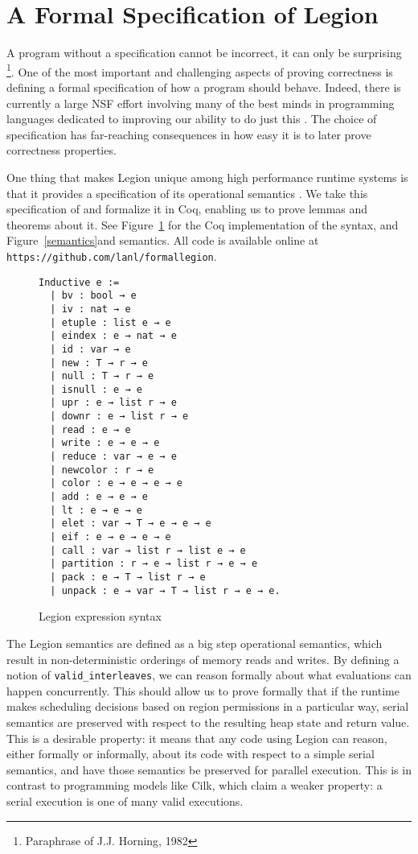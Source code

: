 \documentclass[sigconf]{acmart}
\begin{document}
\section{A Formal Specification of Legion}

A program without a specification cannot be incorrect, it can only be
surprising \footnote{Paraphrase of J.J. Horning, 1982}. One of the most
important and challenging aspects of proving correctness is defining a formal
specification of how a program should behave. Indeed, there is currently a
large NSF effort involving many of the best minds in programming languages
dedicated to improving our ability to do just this \cite{deepspec}. The choice
of specification has far-reaching consequences in how easy it is to later prove
correctness properties. 

One thing that makes Legion unique among high performance runtime systems is
that it provides a specification of its operational semantics \cite{oopsla13}.
We take this specification of and formalize it in Coq, enabling us to prove
lemmas and theorems about it. See Figure~\ref{syntax} for the Coq
implementation of the syntax, and Figure~\ref{semantics}and semantics. All code
is available online at \texttt{https://github.com/lanl/formallegion}. 

\begin{figure}
\centering
\begin{BVerbatim}
Inductive e :=
  | bv : bool → e
  | iv : nat → e
  | etuple : list e → e
  | eindex : e → nat → e
  | id : var → e
  | new : T → r → e
  | null : T → r → e
  | isnull : e → e
  | upr : e → list r → e
  | downr : e → list r → e
  | read : e → e 
  | write : e → e → e
  | reduce : var → e → e
  | newcolor : r → e
  | color : e → e → e → e
  | add : e → e → e
  | lt : e → e → e
  | elet : var → T → e → e → e
  | eif : e → e → e → e
  | call : var → list r → list e → e
  | partition : r → e → list r → e → e
  | pack : e → T → list r → e
  | unpack : e → var → T → list r → e → e.
\end{BVerbatim}
\caption{Legion expression syntax}
\label{syntax}
\end{figure}

The Legion semantics are defined as a big step operational semantics, which
result in non-deterministic orderings of memory reads and writes. By defining a
notion of \texttt{valid\_interleaves}, we can reason formally about what evaluations 
can happen concurrently. This should allow us to prove formally that if the
runtime makes scheduling decisions based on region permissions in a particular
way, serial semantics are preserved with respect to the resulting heap state
and return value. This is a desirable property: it means that any code using
Legion can reason, either formally or informally, about its code with respect
to a simple serial semantics, and have those semantics be preserved for
parallel execution. This is in contrast to programming models like Cilk, which
claim a weaker property: a serial execution is one of many valid executions. 
\end{document}
